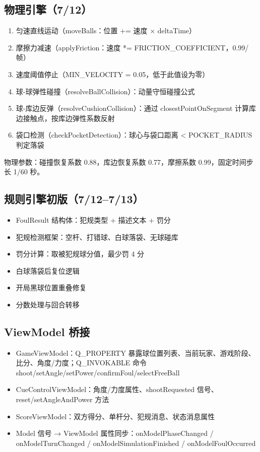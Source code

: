 \documentclass[11pt]{ctexart}
\begin{document}
\subsection{物理引擎（7/12）}

\begin{enumerate}[leftmargin=*]
\item 匀速直线运动（moveBalls：位置 += 速度 × deltaTime）
\item 摩擦力减速（applyFriction：速度 *= FRICTION\_COEFFICIENT，0.99/帧）
\item 速度阈值停止（MIN\_VELOCITY = 0.05，低于此值设为零）
\item 球-球弹性碰撞（resolveBallCollision）：动量守恒碰撞公式
\item 球-库边反弹（resolveCushionCollision）：通过 closestPointOnSegment 计算库边接触点，按库边弹性系数反射
\item 袋口检测（checkPocketDetection）：球心与袋口距离 < POCKET\_RADIUS 判定落袋
\end{enumerate}

物理参数：碰撞恢复系数 0.88，库边恢复系数 0.77，摩擦系数 0.99，固定时间步长 1/60 秒。

\subsection{规则引擎初版（7/12--7/13）}

\begin{itemize}
\item FoulResult 结构体：犯规类型 + 描述文本 + 罚分
\item 犯规检测框架：空杆、打错球、白球落袋、无球碰库
\item 罚分计算：取被犯规球分值，最少罚 4 分
\item 白球落袋后复位逻辑
\item 开局黑球位置重叠修复
\item 分数处理与回合转移
\end{itemize}

\subsection{ViewModel 桥接}

\begin{itemize}
\item GameViewModel：Q\_PROPERTY 暴露球位置列表、当前玩家、游戏阶段、比分、角度/力度；Q\_INVOKABLE 命令 shoot/setAngle/setPower/confirmFoul/selectFreeBall
\item CueControlViewModel：角度/力度属性、shootRequested 信号、reset/setAngleAndPower 方法
\item ScoreViewModel：双方得分、单杆分、犯规消息、状态消息属性
\item Model 信号 → ViewModel 属性同步：onModelPhaseChanged / onModelTurnChanged / onModelSimulationFinished / onModelFoulOccurred
\end{itemize}
\end{document}
